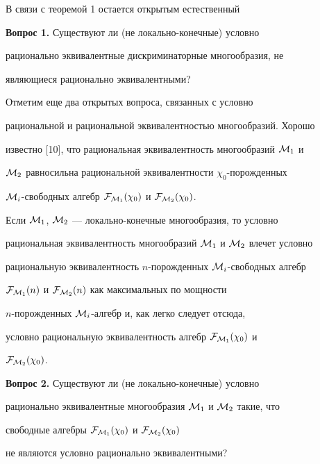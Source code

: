 В связи с теоремой 1 остается открытым естественный


\medskip





{\bf Вопрос 1.} Существуют ли (не локально-конечные) условно


рационально эквивалентные дискриминаторные многообразия, не


являющиеся рационально эквивалентными?


\medskip





Отметим еще два открытых вопроса, связанных с условно


рациональной и рациональной эквивалентностью многообразий. Хорошо


известно [10], что рациональная эквивалентность многообразий ${\cal M}_1$ и


${\cal M}_2$ равносильна рациональной эквивалентности $\chi_0$-порожденных


\linebreak


${\cal M}_i$-свободных алгебр ${\cal F}_{{\cal M}_1}(\chi_0)$ и ${\cal F}_{{\cal M}_2}(\chi_0)$.


Если ${\cal M}_1$, ${\cal M}_2$ --- локально-конечные многообразия, то условно


рациональная эквивалентность многообразий ${\cal M}_1$ и ${\cal M}_2$ влечет условно


рациональную эквивалентность $n$-порожденных ${\cal M}_i$-свободных алгебр


${\cal F}_{{\cal M}_1}(n)$ и ${\cal F}_{{\cal M}_2}(n)$ как максимальных по мощности


$n$-порожденных ${\cal M}_i$-алгебр и, как легко следует отсюда,


условно рациональную эквивалентность алгебр ${\cal F}_{{\cal M}_1}(\chi_0)$ и


${\cal F}_{{\cal M}_2}(\chi_0)$.


\medskip





{\bf Вопрос 2.} Существуют ли (не локально-конечные) условно


рационально эквивалентные многообразия ${\cal M}_1$ и ${\cal M}_2$ такие, что


свободные алгебры ${\cal F}_{{\cal M}_1}(\chi_0)$ и ${\cal F}_{{\cal M}_2}(\chi_0)$


не являются условно рационально эквивалентными?


\medskip





